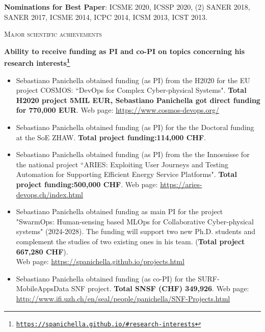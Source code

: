 \documentclass[11pt]{article}
\newcommand{\ra}{$\rightarrow$}
\newcommand{\chg}[2]{\textcolor{red}{\sout{#1}}{\ra}\textcolor{blue}{\uline{#2}}} %
\newcommand{\chg}[2]{#2}
\providecommand*\url[1]{\href{#1}{#1}}
\renewcommand*\url[1]{\href{#1}{\texttt{#1}}}
\begin{document}
\textbf{Nominations for Best Paper}: ICSME 2020, ICSSP 2020, (2) SANER 2018, SANER 2017, ICSME 2014, ICPC 2014, ICSM 2013, ICST 2013.

\medskip \medskip


\textsc{\fontsize{14}{12}\selectfont Major scientific achievements}

\textbf{Ability to receive funding as PI and co-PI on topics concerning his research interests\footnote{\url{https://spanichella.github.io/\#research-interests}}}
\vspace{-2.5mm}
\begin{itemize}
  \item Sebastiano Panichella obtained funding  (as PI) from the H2020 for the EU project COSMOS: ``DevOps for Complex Cyber-physical Systems". \textbf{Total H2020 project 5MIL EUR, Sebastiano Panichella got direct funding for 770,000 EUR}. Web page: \href{https://www.cosmos-devops.org/}{https://www.cosmos-devops.org/}
  \vspace{-2mm}
   \item Sebastiano Panichella obtained funding  (as PI) for the the Doctoral funding at the SoE ZHAW. \textbf{Total project funding:\textbf{114,000 CHF}}.
    \vspace{-2mm}
  \item Sebastiano Panichella obtained funding  (as PI) from the the Innosuisse for the national project ``ARIES: Exploiting User Journeys and Testing Automation for Supporting Efficient Energy Service Platforms". \textbf{Total project funding:\textbf{500,000 CHF}}. Web page: \href{https://aries-devops.ch/index.html}{https://aries-devops.ch/index.html}
    \vspace{-2mm}
\item Sebastiano Panichella obtained funding as main PI for
   the project "SwarmOps: Human-sensing based MLOps for Collaborative Cyber-physical systems" (2024-2028). The funding will support two new Ph.D. students and complement the studies of two existing ones in his team. (\textbf{Total project 667,280 CHF}). \\Web page: \href{https://spanichella.github.io/projects.html}{https://spanichella.github.io/projects.html}
      \vspace{-2mm}
  \item Sebastiano Panichella obtained funding  (as co-PI) for
   the SURF-MobileAppsData SNF project. \textbf{Total SNSF (CHF) 349,926}. Web page: \href{http://www.ifi.uzh.ch/en/seal/people/panichella/SNF-Projects.html}{http://www.ifi.uzh.ch/en/seal/people/panichella/SNF-Projects.html}
\vspace{-2mm}
\end{itemize}
\end{document}
